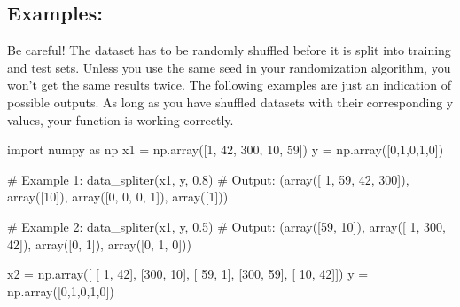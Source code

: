 \documentclass[]{article}
\newenvironment{Shaded}{\begin{snugshade}}{\end{snugshade}}
\newcommand{\CommentTok}[1]{\textcolor[rgb]{0.48,0.49,0.49}{#1}}
\newcommand{\DecValTok}[1]{\textcolor[rgb]{0.96,0.45,0.00}{#1}}
\newcommand{\FloatTok}[1]{\textcolor[rgb]{0.96,0.45,0.00}{#1}}
\newcommand{\ImportTok}[1]{\textcolor[rgb]{0.15,0.68,0.38}{#1}}
\newcommand{\NormalTok}[1]{\textcolor[rgb]{0.81,0.81,0.76}{#1}}
\newcommand{\OperatorTok}[1]{\textcolor[rgb]{0.81,0.81,0.76}{#1}}
\begin{document}
\hypertarget{examples-1}{%
\subsection{Examples:}\label{examples-1}}

Be careful! The dataset has to be randomly shuffled before it is split
into training and test sets. Unless you use the same seed in your
randomization algorithm, you won't get the same results twice. The
following examples are just an indication of possible outputs. As long
as you have shuffled datasets with their corresponding y values, your
function is working correctly.

\begin{Shaded}
\begin{Highlighting}[]
\ImportTok{import}\NormalTok{ numpy }\ImportTok{as}\NormalTok{ np}
\NormalTok{x1 }\OperatorTok{=}\NormalTok{ np.array([}\DecValTok{1}\NormalTok{, }\DecValTok{42}\NormalTok{, }\DecValTok{300}\NormalTok{, }\DecValTok{10}\NormalTok{, }\DecValTok{59}\NormalTok{])}
\NormalTok{y }\OperatorTok{=}\NormalTok{ np.array([}\DecValTok{0}\NormalTok{,}\DecValTok{1}\NormalTok{,}\DecValTok{0}\NormalTok{,}\DecValTok{1}\NormalTok{,}\DecValTok{0}\NormalTok{])}

\CommentTok{# Example 1:}
\NormalTok{data_spliter(x1, y, }\FloatTok{0.8}\NormalTok{)}
\CommentTok{# Output:}
\NormalTok{(array([  }\DecValTok{1}\NormalTok{,  }\DecValTok{59}\NormalTok{,  }\DecValTok{42}\NormalTok{, }\DecValTok{300}\NormalTok{]), array([}\DecValTok{10}\NormalTok{]), array([}\DecValTok{0}\NormalTok{, }\DecValTok{0}\NormalTok{, }\DecValTok{0}\NormalTok{, }\DecValTok{1}\NormalTok{]), array([}\DecValTok{1}\NormalTok{]))}

\CommentTok{# Example 2:}
\NormalTok{data_spliter(x1, y, }\FloatTok{0.5}\NormalTok{)}
\CommentTok{# Output:}
\NormalTok{(array([}\DecValTok{59}\NormalTok{, }\DecValTok{10}\NormalTok{]), array([  }\DecValTok{1}\NormalTok{, }\DecValTok{300}\NormalTok{,  }\DecValTok{42}\NormalTok{]), array([}\DecValTok{0}\NormalTok{, }\DecValTok{1}\NormalTok{]), array([}\DecValTok{0}\NormalTok{, }\DecValTok{1}\NormalTok{, }\DecValTok{0}\NormalTok{]))}

\NormalTok{x2 }\OperatorTok{=}\NormalTok{ np.array([ [  }\DecValTok{1}\NormalTok{,  }\DecValTok{42}\NormalTok{],}
\NormalTok{                [}\DecValTok{300}\NormalTok{,  }\DecValTok{10}\NormalTok{],}
\NormalTok{                [ }\DecValTok{59}\NormalTok{,   }\DecValTok{1}\NormalTok{],}
\NormalTok{                [}\DecValTok{300}\NormalTok{,  }\DecValTok{59}\NormalTok{],}
\NormalTok{                [ }\DecValTok{10}\NormalTok{,  }\DecValTok{42}\NormalTok{]])}
\NormalTok{y }\OperatorTok{=}\NormalTok{ np.array([}\DecValTok{0}\NormalTok{,}\DecValTok{1}\NormalTok{,}\DecValTok{0}\NormalTok{,}\DecValTok{1}\NormalTok{,}\DecValTok{0}\NormalTok{])}


\end{Highlighting}
\end{Shaded}
\end{document}
